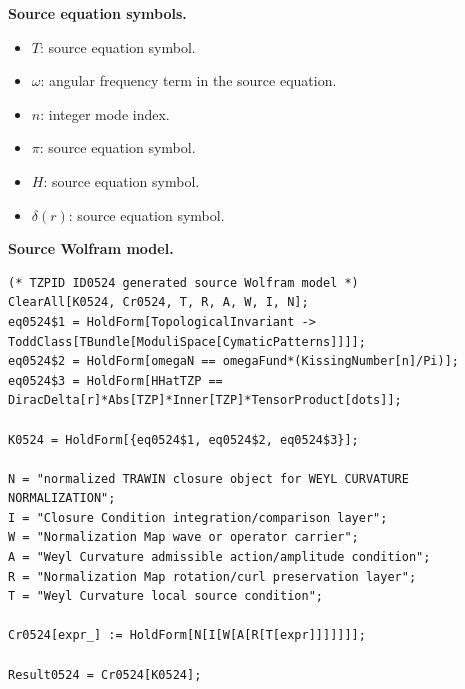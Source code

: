 \begin{minipage}[t]{0.49\linewidth}
\begingroup
\small
\raggedright
\textbf{Source equation symbols.}\par
\begin{itemize}[leftmargin=1.35em,itemsep=1pt,topsep=1pt,parsep=0pt]
    \item $T$: source equation symbol.
    \item $\omega$: angular frequency term in the source equation.
    \item $n$: integer mode index.
    \item $\pi$: source equation symbol.
    \item $H$: source equation symbol.
    \item $\delta(r)$: source equation symbol.
\end{itemize}
\endgroup
\end{minipage}\hfill
\begin{minipage}[t]{0.47\linewidth}
\begingroup
\scriptsize
\raggedright
\textbf{Source Wolfram model.}\par
\begin{Verbatim}[fontsize=\tiny,breaklines=true,breakanywhere=true]
(* TZPID ID0524 generated source Wolfram model *)
ClearAll[K0524, Cr0524, T, R, A, W, I, N];
eq0524$1 = HoldForm[TopologicalInvariant -> ToddClass[TBundle[ModuliSpace[CymaticPatterns]]]];
eq0524$2 = HoldForm[omegaN == omegaFund*(KissingNumber[n]/Pi)];
eq0524$3 = HoldForm[HHatTZP == DiracDelta[r]*Abs[TZP]*Inner[TZP]*TensorProduct[dots]];

K0524 = HoldForm[{eq0524$1, eq0524$2, eq0524$3}];

N = "normalized TRAWIN closure object for WEYL CURVATURE NORMALIZATION";
I = "Closure Condition integration/comparison layer";
W = "Normalization Map wave or operator carrier";
A = "Weyl Curvature admissible action/amplitude condition";
R = "Normalization Map rotation/curl preservation layer";
T = "Weyl Curvature local source condition";

Cr0524[expr_] := HoldForm[N[I[W[A[R[T[expr]]]]]]];

Result0524 = Cr0524[K0524];
\end{Verbatim}
\endgroup
\end{minipage}

